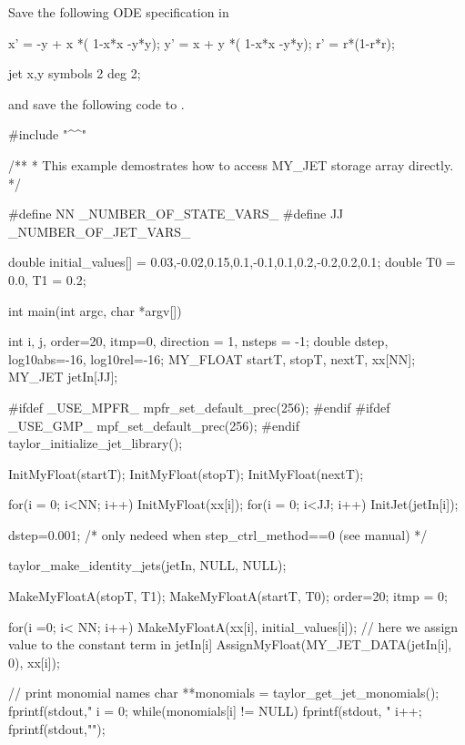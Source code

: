 \documentclass[10pt]{article}
\theoremstyle{remark}
\newcommand{\inputfile}{}
\newcommand{\mainfile}{}
\newcommand{\odehfile}{}
\begin{document}
\vspace{4mm}
Save the following ODE specification in \inputfile{}
\begin{code}[title={File: \inputfile{}}]
    x' = -y + x *( 1-x*x -y*y);
    y' =  x + y *( 1-x*x -y*y);
    r' = r*(1-r*r);
    
    jet x,y  symbols 2 deg 2;
\end{code}
and save the following code to \mainfile{}.
\begin{code}[title={File: \mainfile{}}]
    #include "^\odehfile{}^"
    
    /**
     *  This example demostrates how to access MY_JET storage array directly.
     */
    
    #define NN  _NUMBER_OF_STATE_VARS_
    #define JJ  _NUMBER_OF_JET_VARS_ 
    
    double initial_values[] = {0.03,-0.02,0.15,0.1,-0.1,0.1,0.2,-0.2,0.2,0.1};
    double T0 = 0.0, T1 = 0.2;
     
    int main(int argc, char *argv[])
    {
    	 int       i, j, order=20, itmp=0, direction = 1, nsteps = -1;
    	 double    dstep, log10abs=-16, log10rel=-16;
    	 MY_FLOAT  startT, stopT, nextT, xx[NN];
    	 MY_JET    jetIn[JJ];
    	 
    #ifdef _USE_MPFR_	 
    	 mpfr_set_default_prec(256);
    #endif
    #ifdef _USE_GMP_	 
    	 mpf_set_default_prec(256);
    #endif	 
    	 taylor_initialize_jet_library();
    	 
    	 InitMyFloat(startT);
    	 InitMyFloat(stopT);
    	 InitMyFloat(nextT);
    	 
    	 for(i = 0; i<NN; i++) {InitMyFloat(xx[i]);}
    	 for(i = 0; i<JJ; i++) {InitJet(jetIn[i]);}
    
    
    	 dstep=0.001; /* only nedeed when step_ctrl_method==0 (see manual) */
    
    	 taylor_make_identity_jets(jetIn, NULL, NULL);
    
    	 MakeMyFloatA(stopT, T1);
    	 MakeMyFloatA(startT, T0);	 
    	 order=20;
    	 itmp = 0;
    
    	 for(i =0; i< NN; i++) {
    	   MakeMyFloatA(xx[i],  initial_values[i]);
    	   // here we assign value to the constant term in jetIn[i]
    	   AssignMyFloat(MY_JET_DATA(jetIn[i], 0),  xx[i]);	   	   
    	 }
    
    	 // print monomial names
    	 {
    	   char **monomials = taylor_get_jet_monomials();
    	   fprintf(stdout,"%
    	   i = 0;
    	   while(monomials[i] != NULL) {
    	     fprintf(stdout, "%
    	     i++;
    	   }
    	   fprintf(stdout,"\n");
    	 }
    	 
}
\end{code}
\end{document}
